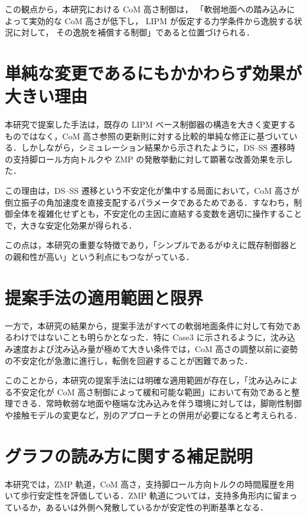 この観点から，本研究における CoM 高さ制御は，
「軟弱地面への踏み込みによって実効的な CoM 高さが低下し，
LIPM が仮定する力学条件から逸脱する状況に対して，
その逸脱を補償する制御」であると位置づけられる．

\section{単純な変更であるにもかかわらず効果が大きい理由}
\label{sec:qa_simple_but_effective}

本研究で提案した手法は，既存の LIPM ベース制御器の構造を大きく変更するものではなく，CoM 高さ参照の更新則に対する比較的単純な修正に基づいている．しかしながら，シミュレーション結果から示されたように，DS--SS 遷移時の支持脚ロール方向トルクや ZMP の発散挙動に対して顕著な改善効果を示した．

この理由は，DS--SS 遷移という不安定化が集中する局面において，CoM 高さが倒立振子の角加速度を直接支配するパラメータであるためである．すなわち，制御全体を複雑化せずとも，不安定化の主因に直結する変数を適切に操作することで，大きな安定化効果が得られる．

この点は，本研究の重要な特徴であり，「シンプルであるがゆえに既存制御器との親和性が高い」という利点にもつながっている．

\section{提案手法の適用範囲と限界}
\label{sec:qa_applicability_limit}

一方で，本研究の結果から，提案手法がすべての軟弱地面条件に対して有効であるわけではないことも明らかとなった．特に Case3 に示されるように，沈み込み速度および沈み込み量が極めて大きい条件では，CoM 高さの調整以前に姿勢の不安定化が急激に進行し，転倒を回避することが困難であった．

このことから，本研究の提案手法には明確な適用範囲が存在し，「沈み込みによる不安定化が CoM 高さ制御によって緩和可能な範囲」において有効であると整理できる．常時軟弱な地面や極端な沈み込みを伴う環境に対しては，脚剛性制御や接触モデルの変更など，別のアプローチとの併用が必要になると考えられる．

\section{グラフの読み方に関する補足説明}
\label{sec:qa_graph_explanation}

本研究では，ZMP 軌道，CoM 高さ，支持脚ロール方向トルクの時間履歴を用いて歩行安定性を評価している．ZMP 軌道については，支持多角形内に留まっているか，あるいは外側へ発散しているかが安定性の判断基準となる．

